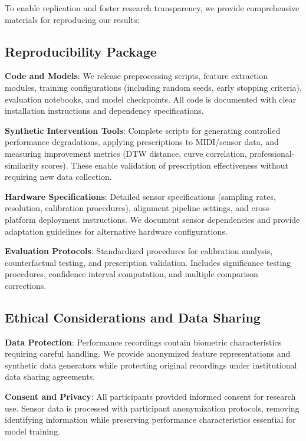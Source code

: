 \documentclass[sigconf,review,anonymous]{acmart}
\begin{document}
To enable replication and foster research transparency, we provide comprehensive materials for reproducing our results:

\subsection{Reproducibility Package}

\textbf{Code and Models}: We release preprocessing scripts, feature extraction modules, training configurations (including random seeds, early stopping criteria), evaluation notebooks, and model checkpoints. All code is documented with clear installation instructions and dependency specifications.

\textbf{Synthetic Intervention Tools}: Complete scripts for generating controlled performance degradations, applying prescriptions to MIDI/sensor data, and measuring improvement metrics (DTW distance, curve correlation, professional-similarity scores). These enable validation of prescription effectiveness without requiring new data collection.

\textbf{Hardware Specifications}: Detailed sensor specifications (sampling rates, resolution, calibration procedures), alignment pipeline settings, and cross-platform deployment instructions. We document sensor dependencies and provide adaptation guidelines for alternative hardware configurations.

\textbf{Evaluation Protocols}: Standardized procedures for calibration analysis, counterfactual testing, and prescription validation. Includes significance testing procedures, confidence interval computation, and multiple comparison corrections.

\subsection{Ethical Considerations and Data Sharing}

\textbf{Data Protection}: Performance recordings contain biometric characteristics requiring careful handling. We provide anonymized feature representations and synthetic data generators while protecting original recordings under institutional data sharing agreements.

\textbf{Consent and Privacy}: All participants provided informed consent for research use. Sensor data is processed with participant anonymization protocols, removing identifying information while preserving performance characteristics essential for model training.
\end{document}
